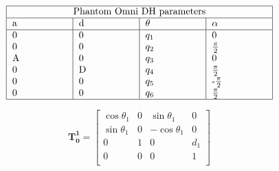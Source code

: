 \begin{align}
\begin{tabular}{ |p{2cm}|p{2cm}|p{2cm}|p{2cm}|  }
 \hline
 \multicolumn{4}{|c|}{Phantom Omni DH parameters} \\
 \hline
 a &d &$\theta$ &$\alpha$ \\
 \hline
 0          & 0   &$q_{1}$&   0\\
 0          &   0           & $q_{2}$ &$\frac{\pi}{2}$\\
 A         & 0   & $q_{3}$    &  0\\
 0          & D             & $q_{4}$     & $\frac{\pi}{2}$\\
 0& 0 & $q_{5}$ &-$\frac{\pi}{2}$\\
  0& 0 & $q_{6}$ &$\frac{\pi}{2}$\\
 \hline
\end{tabular}
\end{align}



\begin{equation}
\mathbf{T_0^1} =\begin{bmatrix} \cos\theta_{1}& 0 & \sin\theta_{1} & 0\\
\sin\theta_{1}& 0 & -\cos\theta_{1} & 0\\
0 & 1 & 0 & d_{1}\\
0 & 0 & 0 & 1\\
\end{bmatrix}
\end{equation}







\appendix

\clearpage



